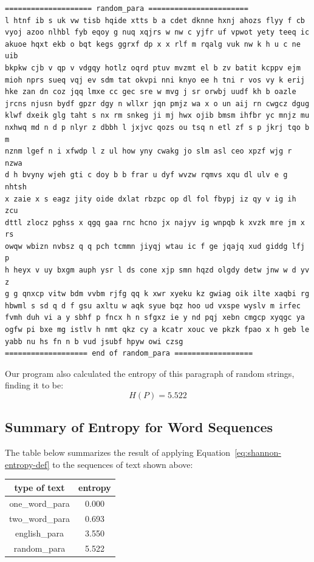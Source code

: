 \documentclass[11pt]{article}
\begin{document}
\begin{tiny}
\begin{verbatim}
==================== random_para =======================
l htnf ib s uk vw tisb hqide xtts b a cdet dknne hxnj ahozs flyy f cb
vyoj azoo nlhbl fyb eqoy g nuq xqjrs w nw c yjfr uf vpwot yety teeq ic
akuoe hqxt ekb o bqt kegs ggrxf dp x x rlf m rqalg vuk nw k h u c ne uib
bkpkw cjb v qp v vdgqy hotlz oqrd ptuv mvzmt el b zv batit kcppv ejm
mioh nprs sueq vqj ev sdm tat okvpi nni knyo ee h tni r vos vy k erij
hke zan dn coz jqq lmxe cc gec sre w mvg j sr orwbj uudf kh b oazle
jrcns njusn bydf gpzr dgy n wllxr jqn pmjz wa x o un aij rn cwgcz dgug
klwf dxeik glg taht s nx rm snkeg ji mj hwx ojib bmsm ihfbr yc mnjz mu
nxhwq md n d p nlyr z dbbh l jxjvc qozs ou tsq n etl zf s p jkrj tqo b m
nznm lgef n i xfwdp l z ul how yny cwakg jo slm asl ceo xpzf wjg r nzwa
d h bvyny wjeh gti c doy b b frar u dyf wvzw rqmvs xqu dl ulv e g nhtsh
x zaie x s eagz jity oide dxlat rbzpc op dl fol fbypj iz qy v ig ih zcu
dttl zlocz pghss x qgq gaa rnc hcno jx najyv ig wnpqb k xvzk mre jm x rs
owqw wbizn nvbsz q q pch tcmmn jiyqj wtau ic f ge jqajq xud giddg lfj p
h heyx v uy bxgm auph ysr l ds cone xjp smn hqzd olgdy detw jnw w d yv z
g g qnxcp vitw bdm vvbm rjfg qq k xwr xyeku kz gwiag oik ilte xaqbi rg
hbwml s sd q d f gsu axltu w aqk syue bqz hoo ud vxspe wyslv m irfec
fvmh duh vi a y sbhf p fncx h n sfgxz ie y nd pqj xebn cmgcp xyqgc ya
ogfw pi bxe mg istlv h nmt qkz cy a kcatr xouc ve pkzk fpao x h geb le
yabb nu hs fn n b vud jsubf hpyw owi czsg
=================== end of random_para ==================
\end{verbatim}
\end{tiny}

Our program also calculated the entropy of this paragraph of random
strings, finding it to be:
$$
H(P) = 5.522
$$


\subsection{Summary of Entropy for Word Sequences}

The table below summarizes the result of applying
Equation~\ref{eq:shannon-entropy-def} to the sequences of text shown
above:

\begin{center}
\begin{tabular}{ |c|c| }
  \hline
  type of text  &   entropy \\
\hline
one\_word\_para &   0.000 \\
two\_word\_para &   0.693 \\
english\_para  &   3.550 \\
random\_para   &   5.522 \\
\hline
\end{tabular}
\end{center}
\end{document}
